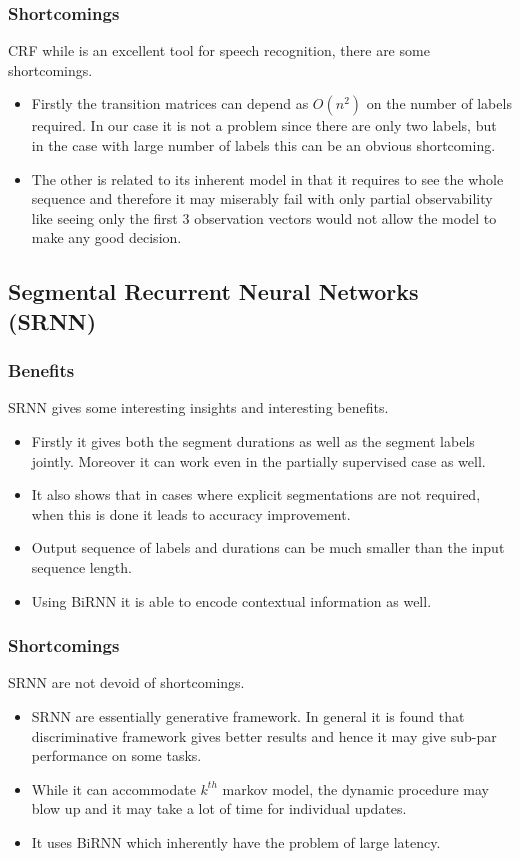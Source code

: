 \documentclass[letterpaper]{article} %
\begin{document}
\subsubsection{Shortcomings} CRF while is an excellent tool for speech recognition, there are some shortcomings.
\begin{itemize}
\item Firstly the transition matrices can depend as $O(n^2)$ on the number of labels required. In our case it is not a problem since there are only two labels, but in the case with large number of labels this can be an obvious shortcoming.
\item The other is related to its inherent model in that it requires to see the whole sequence and therefore it may miserably fail with only partial observability like seeing only the first 3 observation vectors would not allow the model to make any good decision.
\end{itemize}
\subsection{Segmental Recurrent Neural Networks (SRNN)}
\subsubsection{Benefits} SRNN gives some interesting insights and interesting benefits.
\begin{itemize}
\item Firstly it gives both the segment durations as well as the segment labels jointly. Moreover it can work even in the partially supervised case as well.
\item It also shows that in cases where explicit segmentations are not required, when this is done it leads to accuracy improvement.
\item Output sequence of labels and durations can be much smaller than the input sequence length.
\item Using BiRNN it is able to encode contextual information as well.
\end{itemize}

\subsubsection{Shortcomings} SRNN are not devoid of shortcomings.
\begin{itemize}
\item SRNN are essentially generative framework. In general it is found that discriminative framework gives better results and hence it may give sub-par performance on some tasks.
\item While it can accommodate $k^{th}$ markov model, the dynamic procedure may blow up and it may take a lot of time for individual updates.
\item It uses BiRNN which inherently have the problem of large latency.
\end{itemize}



\end{document}
